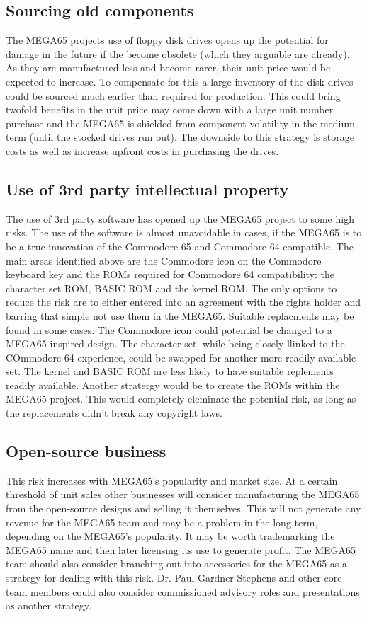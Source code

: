 \subsection{Sourcing old components}
The MEGA65 projects use of floppy disk drives opens up the potential for damage in the future if the become obsolete (which they arguable are already). As they are manufactured less and become rarer, their unit price would be expected to increase. To compensate for this a large inventory of the disk drives could be sourced much earlier than required for production. This could bring twofold benefits in the unit price may come down with a large unit number purchase and the MEGA65 is shielded from component volatility in the medium term (until the stocked drives run out). The downside to this strategy is storage costs as well as increase upfront costs in purchasing the drives.

\subsection{Use of 3rd party intellectual property}
The use of 3rd party software has opened up the MEGA65 project to some high risks. The use of the software is almost unavoidable in cases, if the MEGA65 is to be a true innovation of the Commodore 65 and Commodore 64 compatible. The main areas identified above are the Commodore icon on the Commodore keyboard key and the ROMs required for Commodore 64 compatibility: the character set ROM, BASIC ROM and the kernel ROM. The only options to reduce the risk are to either entered into an agreement with the rights holder and barring that simple not use them in the MEGA65. Suitable replacments may be found in some cases. The Commodore icon could potential be changed to a MEGA65 inspired design. The character set, while being closely llinked to the COmmodore 64 experience, could be swapped for another more readily available set. The kernel and BASIC ROM are less likely to have suitable replements readily available. Another stratergy would be to create the ROMs within the MEGA65 project. This would completely eleminate the potential risk, as long as the replacements didn't break any copyright laws. 

\subsection{Open-source business}
This risk increases with MEGA65's popularity and market size. At a certain threshold of unit sales other businesses will consider manufacturing the MEGA65 from the open-source designs and selling it themselves. This will not generate any revenue for the MEGA65 team and may be a problem in the long term, depending on the MEGA65's popularity. It may be worth trademarking the MEGA65 name and then later licensing its use to generate profit. The MEGA65 team should also consider branching out into accessories for the MEGA65 as a strategy for dealing with this risk. Dr. Paul Gardner-Stephens and other core team members could also consider commissioned advisory roles and presentations as another strategy. 

